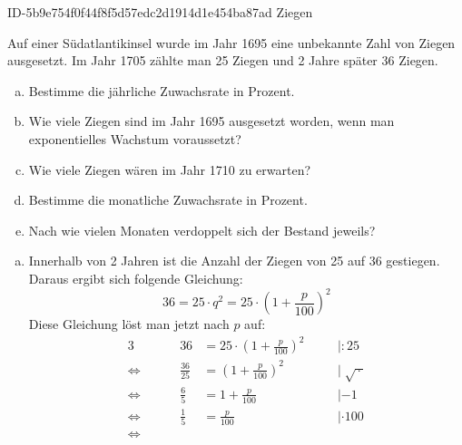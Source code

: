 \begin{exercise}
      {ID-5b9e754f0f44f8f5d57edc2d1914d1e454ba87ad}
      {Ziegen}
  \ifproblem\problem\par
    Auf einer Südatlantikinsel wurde im Jahr 1695 eine
    unbekannte Zahl von Ziegen ausgesetzt. Im Jahr 1705
    zählte man 25 Ziegen und 2 Jahre später
    36 Ziegen.
    \begin{enumerate}[a)]
      \item Bestimme die jährliche Zuwachsrate in Prozent.
      \item Wie viele Ziegen sind im Jahr 1695 ausgesetzt
            worden, wenn man exponentielles Wachstum voraussetzt?
      \item Wie viele Ziegen wären im Jahr 1710 zu erwarten?
      \item Bestimme die monatliche Zuwachsrate in Prozent.
      \item Nach wie vielen Monaten verdoppelt sich der Bestand
            jeweils?
    \end{enumerate}
  \fi
  \ifoutcome\outcome
    \begin{enumerate}[a)]
      \item Innerhalb von 2 Jahren ist die Anzahl der Ziegen
            von 25 auf 36 gestiegen. Daraus ergibt sich folgende
            Gleichung:
            \begin{equation*}
              36=25\cdot q^2=25\cdot\left(1+\frac{p}{100}\right)^2
            \end{equation*}
            Diese Gleichung löst man jetzt nach $p$ auf:
            \begin{alignat*}{3}
              \quad&\quad
              &
              36&=25\cdot\left(1+\frac{p}{100}\right)^2
              &
              \quad&|:25
              \\[1ex]
              \Leftrightarrow&\quad
              &
              \frac{36}{25}&=\left(1+\frac{p}{100}\right)^2
              &
              \quad&|\;\sqrt{\,\cdot\,}
              \\[1ex]
              \Leftrightarrow&\quad
              &
              \frac{6}{5}&=1+\frac{p}{100}
              &
              \quad&|-1
              \\[1ex]
              \Leftrightarrow&\quad
              &
              \frac{1}{5}&=\frac{p}{100}
              &
              \quad&|\cdot100
              \\[1ex]
              \Leftrightarrow&\quad
              &

\end{alignat*}
\end{enumerate}
\end{exercise}
